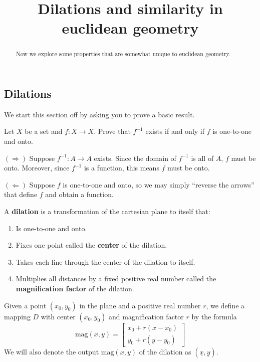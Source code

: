 \documentclass[newpage,hints,handout,12pt,noauthor,nooutcomes]{ximera}
\title{Dilations and similarity in euclidean geometry}
\begin{document}
\begin{abstract}
Now we explore some properties that are somewhat unique to euclidean
geometry.
\end{abstract}
\maketitle

\subsection{Dilations}

We start this section off by asking you to prove a basic result.

\begin{problem}
  Let $X$ be a set and $f: X \to X$. Prove that $f^{-1}$ exists if and
  only if $f$ is one-to-one and onto.
  \begin{freeResponse}
    $(\Rightarrow)$ Suppose $f^{-1}:A\to A$ exists. Since the domain
    of $f^{-1}$ is all of $A$, $f$ must be onto. Moreover, since
    $f^{-1}$ is a function, this means $f$ must be onto. 
    
    $(\Leftarrow)$ Suppose $f$ is one-to-one and onto, so we may simply
    ``reverse the arrows'' that define $f$ and obtain a function.
  \end{freeResponse}
\end{problem}


\begin{definition}
A \textbf{dilation} is a transformation of the cartesian plane to
itself that:
\begin{enumerate}
\item Is one-to-one and onto.
\item Fixes one point called the \textbf{center} of the dilation.
\item Takes each line through the center of the dilation to itself.
\item Multiplies all distances by a fixed positive real number called
  the \textbf{magnification factor} of the dilation.
\end{enumerate}
\end{definition}

\begin{definition}
Given a point $\left(x_{0},y_{0}\right)$ in the plane and a positive
real number $r$, we define a mapping $D$ with center $\left(
x_{0},y_{0}\right)$ and magnification factor $r$ by the formula
\[
\mathrm{mag}(x,y)  =
\begin{bmatrix}
  x_0 + r(x-x_0)\\
  y_0 + r(y-y_0)
  \end{bmatrix}
\]
We will also denote the output $\mathrm{mag}(x,y)$ of the dilation
as $\left(\underline{x},\underline{y}\right)$.
\end{definition}
\end{document}
